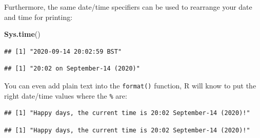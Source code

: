 \documentclass[
  12pt,
  krantz2]{krantz}
\makeatletter
\newenvironment{Shaded}{\begin{snugshade}}{\end{snugshade}}
\newcommand{\KeywordTok}[1]{\textcolor[rgb]{0.13,0.29,0.53}{\textbf{#1}}}
\newcommand{\NormalTok}[1]{#1}
\newcommand{\OperatorTok}[1]{\textcolor[rgb]{0.81,0.36,0.00}{\textbf{#1}}}
\newcommand{\StringTok}[1]{\textcolor[rgb]{0.31,0.60,0.02}{#1}}
\newenvironment{kframe}{%
\medskip{}
\setlength{\fboxsep}{.8em}
 \def\at@end@of@kframe{}%
 \ifinner\ifhmode%
  \def\at@end@of@kframe{\end{minipage}}%
  \begin{minipage}{\columnwidth}%
 \fi\fi%
 \def\FrameCommand##1{\hskip\@totalleftmargin \hskip-\fboxsep
 \colorbox{shadecolor}{##1}\hskip-\fboxsep
     \hskip-\linewidth \hskip-\@totalleftmargin \hskip\columnwidth}%
 \MakeFramed {\advance\hsize-\width
   \@totalleftmargin\z@ \linewidth\hsize
   \@setminipage}}%
 {\par\unskip\endMakeFramed%
 \at@end@of@kframe}
\renewenvironment{Shaded}{\begin{kframe}}{\end{kframe}}
\makeatother
\begin{document}
Furthermore, the same date/time specifiers can be used to rearrange your date and time for printing:

\begin{Shaded}
\begin{Highlighting}[]
\KeywordTok{Sys.time}\NormalTok{()}
\end{Highlighting}
\end{Shaded}

\begin{verbatim}
## [1] "2020-09-14 20:02:59 BST"
\end{verbatim}

\begin{Shaded}
\end{Shaded}

\begin{verbatim}
## [1] "20:02 on September-14 (2020)"
\end{verbatim}

You can even add plain text into the \texttt{format()} function, R will know to put the right date/time values where the \texttt{\%} are:

\begin{Shaded}
\end{Shaded}

\begin{verbatim}
## [1] "Happy days, the current time is 20:02 September-14 (2020)!"
\end{verbatim}

\begin{Shaded}
\end{Shaded}

\begin{verbatim}
## [1] "Happy days, the current time is 20:02 September-14 (2020)!"
\end{verbatim}
\end{document}
